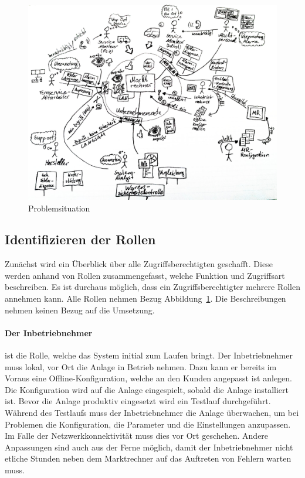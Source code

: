 \documentclass[11pt,a4paper]{report}
\begin{document}
\begin{figure}[h]
\centering
\includegraphics[scale=0.237]{images/problemsituation.jpg}
\caption{Problemsituation}
\label{fig:current_setup}
\end{figure}

\subsection{Identifizieren der Rollen}

Zunächst wird ein Überblick über alle Zugriffsberechtigten geschafft. Diese werden anhand von Rollen zusammengefasst, welche Funktion und Zugriffsart beschreiben. Es ist durchaus möglich, dass ein Zugriffsberechtigter mehrere Rollen annehmen kann. Alle Rollen nehmen Bezug Abbildung~\ref{fig:current_setup}. Die Beschreibungen nehmen keinen Bezug auf die Umsetzung.

\paragraph{Der Inbetriebnehmer} ist die Rolle, welche das System initial zum Laufen bringt. Der Inbetriebnehmer muss lokal, vor Ort die Anlage in Betrieb nehmen. Dazu kann er bereits im Voraus eine Offline-Konfiguration, welche an den Kunden angepasst ist anlegen. Die Konfiguration wird auf die Anlage eingespielt, sobald die Anlage installiert ist. Bevor die Anlage produktiv eingesetzt wird ein Testlauf durchgeführt. Während des Testlaufs muss der Inbetriebnehmer die Anlage überwachen, um bei Problemen die Konfiguration, die Parameter und die Einstellungen anzupassen. Im Falle der Netzwerkkonnektivität muss dies vor Ort geschehen. Andere  Anpassungen sind auch aus der Ferne möglich, damit der Inbetriebnehmer nicht etliche Stunden neben dem Marktrechner auf das Auftreten von Fehlern warten muss.
\end{document}
